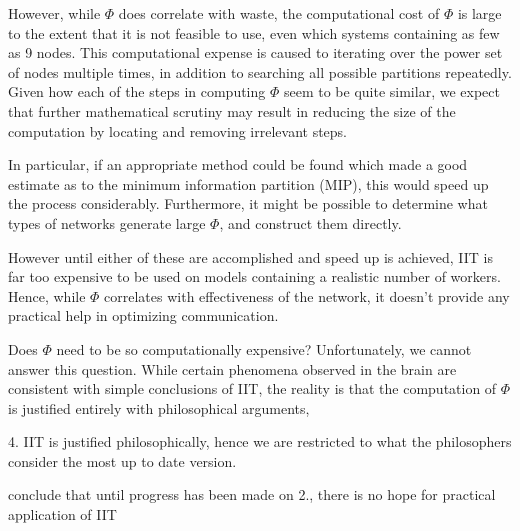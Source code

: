 However, while $\Phi$ does correlate with waste, the computational cost of $\Phi$ is large to the extent that it is not feasible to use, even which systems containing as few as 9 nodes. This computational expense is caused to iterating over the power set of nodes multiple times, in addition to searching all possible partitions repeatedly. Given how each of the steps in computing $\Phi$ seem to be quite similar, we expect that further mathematical scrutiny may result in reducing the size of the computation by locating and removing irrelevant steps. 

In particular, if an appropriate method could be found which made a good estimate as to the minimum information partition (MIP), this would speed up the process considerably. Furthermore, it might be possible to determine what types of networks generate large $\Phi$, and construct them directly.

However until either of these are accomplished and speed up is achieved, IIT is far too expensive to be used on models containing a realistic number of workers. Hence, while $\Phi$ correlates with effectiveness of the network, it doesn't provide any practical help in optimizing communication.

Does $\Phi$ need to be so computationally expensive? Unfortunately, we cannot answer this question. While certain phenomena observed in the brain are consistent with simple conclusions of IIT, the reality is that the computation of $\Phi$ is justified entirely with philosophical arguments, 

4. IIT is justified philosophically, hence we are restricted to what the philosophers consider the most up to date version.

conclude that until progress has been made on 2., there is no hope for practical application of IIT
